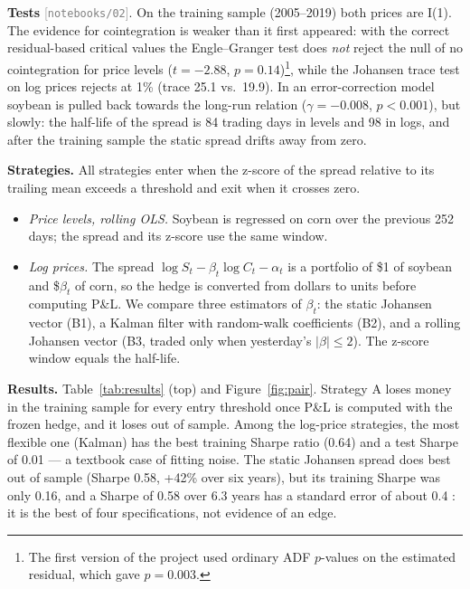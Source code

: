 \documentclass[11pt,a4paper]{article}
\newcommand{\nb}[1]{\textcolor{gray}{\small[\texttt{notebooks/#1}]}}
\begin{document}
\textbf{Tests} \nb{02}. On the training sample (2005--2019) both prices are I(1). The evidence for cointegration is
weaker than it first appeared: with the correct residual-based critical values the Engle--Granger test
\citep{englegranger1987} does \emph{not} reject the null of no cointegration for price levels ($t=-2.88$,
$p=0.14$)\footnote{The first version of the project used ordinary ADF $p$-values on the estimated residual, which gave
$p=0.003$.}, while the Johansen trace test \citep{johansen1991} on log prices rejects at 1\% (trace 25.1 vs.\ 19.9).
In an error-correction model soybean is pulled back towards the long-run relation ($\gamma=-0.008$, $p<0.001$), but
slowly: the half-life of the spread is 84 trading days in levels and 98 in logs, and after the training sample the
static spread drifts away from zero.

\textbf{Strategies.} All strategies enter when the z-score of the spread relative to its trailing mean exceeds a
threshold and exit when it crosses zero.
\begin{itemize}
\item[\textbf{A}] \emph{Price levels, rolling OLS.} Soybean is regressed on corn over the previous 252 days; the
spread and its z-score use the same window.
\item[\textbf{B}] \emph{Log prices.} The spread $\log S_t-\beta_t\log C_t-\alpha_t$ is a portfolio of \$1 of soybean
and \$$\beta_t$ of corn, so the hedge is converted from dollars to units before computing P\&L. We compare three
estimators of $\beta_t$: the static Johansen vector (B1), a Kalman filter with random-walk coefficients \citep[ch.~3]{chan2013}
(B2), and a rolling Johansen vector (B3, traded only when yesterday's $|\beta|\le 2$). The z-score window equals the
half-life.
\end{itemize}

\textbf{Results.} Table~\ref{tab:results} (top) and Figure~\ref{fig:pair}. Strategy A loses money in the training
sample for every entry threshold once P\&L is computed with the frozen hedge, and it loses out of sample. Among the
log-price strategies, the most flexible one (Kalman) has the best training Sharpe ratio (0.64) and a test Sharpe of
0.01 --- a textbook case of fitting noise. The static Johansen spread does best out of sample (Sharpe 0.58, +42\% over
six years), but its training Sharpe was only 0.16, and a Sharpe of 0.58 over 6.3 years has a standard error of
about 0.4 \citep{lo2002}: it is the best of four specifications, not evidence of an edge.
\end{document}
